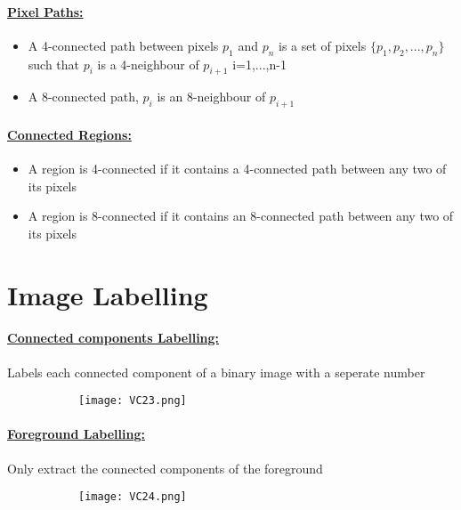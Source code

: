 \documentclass[8pt]{extreport}
\begin{document}
\paragraph{\underline{Pixel Paths:}}
\begin{itemize}
\item A 4-connected path between pixels $p_1$ and $p_n$ is a set of pixels $\{p_1,p_2,...,p_n\}$ such that $p_i$ is a 4-neighbour of $p_{i+1}$ i=1,...,n-1
\item A  8-connected path, $p_i$ is an 8-neighbour of $p_{i+1}$
\end{itemize}

\paragraph{\underline{Connected Regions:}}
\begin{itemize}
\item A region is 4-connected if it contains a 4-connected path between any two of its pixels
\item A region is 8-connected if it contains an 8-connected path between any two of its pixels
\end{itemize}

\section{Image Labelling}

\paragraph{\underline{Connected components Labelling:}} Labels each connected component of a binary image with a seperate number
\begin{figure}[H]
\centering
\begin{subfigure}[b]{0.5\linewidth}
\texttt{[image: VC23.png]}
\end{subfigure}
\end{figure}

\paragraph{\underline{Foreground Labelling:}} Only extract the connected components of the foreground
\begin{figure}[H]
\centering
\begin{subfigure}[b]{0.5\linewidth}
\texttt{[image: VC24.png]}
\end{subfigure}
\end{figure}










 
\end{document}
